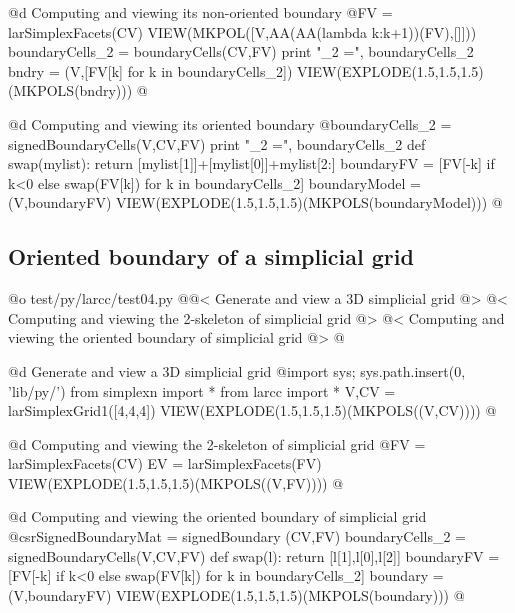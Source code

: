 \documentclass[11pt,oneside]{article}	%
\begin{document}
@d Computing and viewing its non-oriented boundary 
@{FV = larSimplexFacets(CV)
VIEW(MKPOL([V,AA(AA(lambda k:k+1))(FV),[]]))
boundaryCells_2 = boundaryCells(CV,FV)
print "\nboundaryCells_2 =\n", boundaryCells_2
bndry = (V,[FV[k] for k in boundaryCells_2])
VIEW(EXPLODE(1.5,1.5,1.5)(MKPOLS(bndry)))
@}

@d Computing and viewing its oriented boundary
@{boundaryCells_2 = signedBoundaryCells(V,CV,FV)
print "\nboundaryCells_2 =\n", boundaryCells_2
def swap(mylist): return [mylist[1]]+[mylist[0]]+mylist[2:]
boundaryFV = [FV[-k] if k<0 else swap(FV[k]) for k in boundaryCells_2]
boundaryModel = (V,boundaryFV)
VIEW(EXPLODE(1.5,1.5,1.5)(MKPOLS(boundaryModel)))
@}

\subsection{Oriented boundary of a simplicial grid}

@o test/py/larcc/test04.py
@{@< Generate and view a 3D simplicial grid @>
@< Computing and viewing the 2-skeleton of simplicial grid @>
@< Computing and viewing the oriented boundary of simplicial grid @>
@}


@d Generate and view a 3D simplicial grid
@{import sys; sys.path.insert(0, 'lib/py/')
from simplexn import *
from larcc import *
V,CV = larSimplexGrid1([4,4,4])
VIEW(EXPLODE(1.5,1.5,1.5)(MKPOLS((V,CV))))
@}

@d Computing and viewing the 2-skeleton of simplicial grid
@{FV = larSimplexFacets(CV)
EV = larSimplexFacets(FV)
VIEW(EXPLODE(1.5,1.5,1.5)(MKPOLS((V,FV))))
@}

@d Computing and viewing the oriented boundary of simplicial grid
@{csrSignedBoundaryMat = signedBoundary (CV,FV)
boundaryCells_2 = signedBoundaryCells(V,CV,FV)
def swap(l): return [l[1],l[0],l[2]]
boundaryFV = [FV[-k] if k<0 else swap(FV[k]) for k in boundaryCells_2]
boundary = (V,boundaryFV)
VIEW(EXPLODE(1.5,1.5,1.5)(MKPOLS(boundary)))
@}
\end{document}
